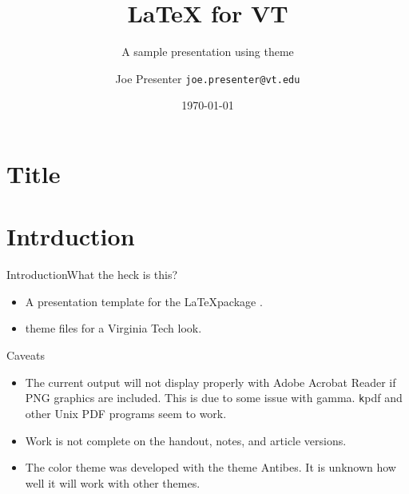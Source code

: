 %
%
%
%
\title[VT \BEAMER]{\LaTeX{ }\BEAMER for VT}
\subtitle{A sample presentation using theme \MyTheme}
\author[Joe Presenter]{Joe Presenter \texttt{joe.presenter@vt.edu}}
\date{\today}
\section{Title}
\begin{frame}
\titlepage
\end{frame}
\section{Intrduction}
\begin{frame}{Introduction}{What the heck is this?}
\begin{itemize}
\item A presentation template for the \LaTeX package \BEAMER.
\item \BEAMER theme files for a Virginia Tech look.
\end{itemize}
\end{frame}
\begin{frame}{Caveats}
\begin{itemize}
\item The current output will not display properly with Adobe Acrobat Reader
if PNG graphics are included.  This is due to some issue with gamma.
{\texttt kpdf} and other Unix PDF programs seem to work.
\item Work is not complete on the handout, notes, and article versions.
\item The color theme was developed with the \BEAMER theme Antibes.  It is
unknown how well it will work with other themes.
\end{itemize}
\end{frame}
